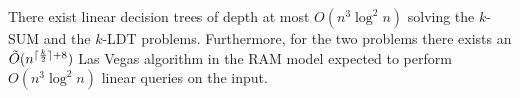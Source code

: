 \begin{theorem}
\label{thm:cube}
There exist linear decision trees of depth at most \(O(n^3\log^2 n)\) solving
the \(k\)-SUM and the \(k\)-LDT problems. Furthermore, for the two problems there
exists an $\tilde{O}(n^{\lceil\frac{k}{2}\rceil+8})$ Las Vegas algorithm in
the RAM model expected to perform $O(n^3\log^2 n)$ linear queries on the input.
\end{theorem}

